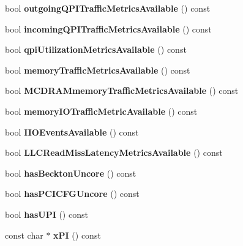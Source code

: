 \begin{DoxyCompactItemize}
bool {\bfseries outgoing\+Q\+P\+I\+Traffic\+Metrics\+Available} () const
\item 
\mbox{\label{class_p_c_m_a822228200e8f6a4f46fd3abb106fae2c}} 
bool {\bfseries incoming\+Q\+P\+I\+Traffic\+Metrics\+Available} () const
\item 
\mbox{\label{class_p_c_m_a913d07e562d0c12276e1d88da68133cf}} 
bool {\bfseries qpi\+Utilization\+Metrics\+Available} () const
\item 
\mbox{\label{class_p_c_m_afc270d601a110e0a6667bfbaf2441844}} 
bool {\bfseries memory\+Traffic\+Metrics\+Available} () const
\item 
\mbox{\label{class_p_c_m_ac43b77a3c73011dc885219d1f02301f0}} 
bool {\bfseries M\+C\+D\+R\+A\+Mmemory\+Traffic\+Metrics\+Available} () const
\item 
\mbox{\label{class_p_c_m_adb2821d0a34e459b897b11b2b6a2bc55}} 
bool {\bfseries memory\+I\+O\+Traffic\+Metric\+Available} () const
\item 
\mbox{\label{class_p_c_m_adb0ec9f5d7d476e15de4b292a8d09227}} 
bool {\bfseries I\+I\+O\+Events\+Available} () const
\item 
\mbox{\label{class_p_c_m_afea9a88fefc7deb2374698498b26a623}} 
bool {\bfseries L\+L\+C\+Read\+Miss\+Latency\+Metrics\+Available} () const
\item 
\mbox{\label{class_p_c_m_a9f46c4337260f8bd2a0239fa34d58ca7}} 
bool {\bfseries has\+Beckton\+Uncore} () const
\item 
\mbox{\label{class_p_c_m_abeaa5778a26d62b6b55a1696a2189ff1}} 
bool {\bfseries has\+P\+C\+I\+C\+F\+G\+Uncore} () const
\item 
\mbox{\label{class_p_c_m_a757dea905954dc838707260c58d86e5f}} 
bool {\bfseries has\+U\+PI} () const
\item 
\mbox{\label{class_p_c_m_accac637ae1f85101df7a04883f09b2da}} 
const char $\ast$ {\bfseries x\+PI} () const
\item 

\end{DoxyCompactItemize}
